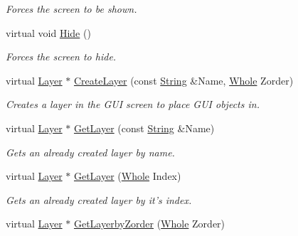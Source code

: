 \begin{DoxyCompactItemize}
\begin{DoxyCompactList}\small\item\em Forces the screen to be shown. \item\end{DoxyCompactList}\item 
\hypertarget{classphys_1_1UI_1_1Screen_acd02862f7386351b7536576dd21782fc}{
virtual void \hyperlink{classphys_1_1UI_1_1Screen_acd02862f7386351b7536576dd21782fc}{Hide} ()}
\label{d8/df0/classphys_1_1UI_1_1Screen_acd02862f7386351b7536576dd21782fc}

\begin{DoxyCompactList}\small\item\em Forces the screen to hide. \item\end{DoxyCompactList}\item 
virtual \hyperlink{classphys_1_1UI_1_1Layer}{Layer} $\ast$ \hyperlink{classphys_1_1UI_1_1Screen_ad3b73f039f840fd2b2dc20219c428e9d}{CreateLayer} (const \hyperlink{namespacephys_aa03900411993de7fbfec4789bc1d392e}{String} \&Name, \hyperlink{namespacephys_a460f6bc24c8dd347b05e0366ae34f34a}{Whole} Zorder)
\begin{DoxyCompactList}\small\item\em Creates a layer in the GUI screen to place GUI objects in. \item\end{DoxyCompactList}\item 
virtual \hyperlink{classphys_1_1UI_1_1Layer}{Layer} $\ast$ \hyperlink{classphys_1_1UI_1_1Screen_a4969b2e17fa22706046f5653c91a2e70}{GetLayer} (const \hyperlink{namespacephys_aa03900411993de7fbfec4789bc1d392e}{String} \&Name)
\begin{DoxyCompactList}\small\item\em Gets an already created layer by name. \item\end{DoxyCompactList}\item 
virtual \hyperlink{classphys_1_1UI_1_1Layer}{Layer} $\ast$ \hyperlink{classphys_1_1UI_1_1Screen_a7aa76ca0a45c7b78d1872388bf6da4dc}{GetLayer} (\hyperlink{namespacephys_a460f6bc24c8dd347b05e0366ae34f34a}{Whole} Index)
\begin{DoxyCompactList}\small\item\em Gets an already created layer by it's index. \item\end{DoxyCompactList}\item 
virtual \hyperlink{classphys_1_1UI_1_1Layer}{Layer} $\ast$ \hyperlink{classphys_1_1UI_1_1Screen_a206f87f758f708f297c0d6311ed4781e}{GetLayerbyZorder} (\hyperlink{namespacephys_a460f6bc24c8dd347b05e0366ae34f34a}{Whole} Zorder)

\end{DoxyCompactItemize}
